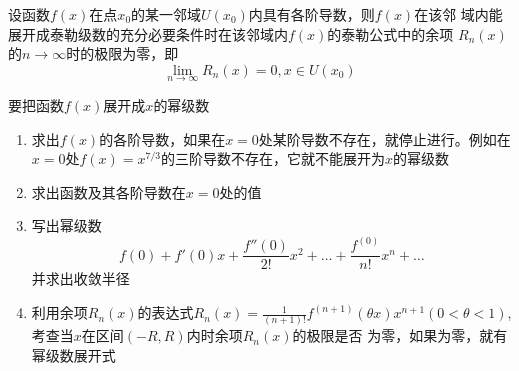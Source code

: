 \documentclass[11pt]{article}
\begin{document}
\begin{theorem}[]
设函数\(f(x)\)在点\(x_0\)的某一邻域\(U(x_0)\)内具有各阶导数，则\(f(x)\)在该邻
域内能展开成泰勒级数的充分必要条件时在该邻域内\(f(x)\)的泰勒公式中的余项
\(R_n(x)\)的\(n\to\infty\)时的极限为零，即
\begin{equation*}
\lim_{n\to\infty}R_n(x)=0,x\in U(x_0)
\end{equation*}
\end{theorem}

要把函数\(f(x)\)展开成\(x\)的幂级数
\begin{enumerate}
\item 求出\(f(x)\)的各阶导数，如果在\(x=0\)处某阶导数不存在，就停止进行。例如在
\(x=0\)处\(f(x)=x^{7/3}\)的三阶导数不存在，它就不能展开为\(x\)的幂级数
\item 求出函数及其各阶导数在\(x=0\)处的值
\item 写出幂级数
\begin{equation*}
f(0)+f'(0)x+\frac{f''(0)}{2!}x^2+\dots+\frac{f^{(0)}}{n!}x^n+\dots
\end{equation*}
并求出收敛半径
\item 利用余项\(R_n(x)\)的表达式\(R_n(x)=\frac{1}{(n+1)!}f^{(n+1)}(\theta
      x)x^{n+1}(0<\theta<1)\),考查当\(x\)在区间\((-R,R)\)内时余项\(R_n(x)\)的极限是否
为零，如果为零，就有幂级数展开式
\end{enumerate}
\end{document}
